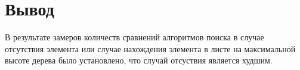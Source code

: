\clearpage
\section{Вывод}

В результате замеров количеств сравнений алгоритмов поиска в случае отсутствия элемента или случае нахождения элемента в листе на максимальной высоте дерева было установлено, что случай отсуствия является худшим.



